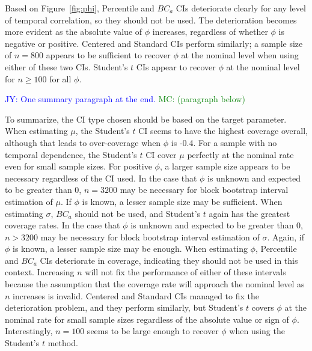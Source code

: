 \documentclass[12pt, letterpaper, titlepage]{article}
\newcommand{\jy}[1]{\textcolor{blue}{JY: #1}}
\newcommand{\mc}[1]{\textcolor{green}{MC: (#1)}}
\begin{document}
Based on Figure~\ref{fig:phi}, 
Percentile and $BC_a$ CIs deteriorate clearly for any level of temporal correlation,
so they should not be used. The deterioration becomes more evident
as the absolute value of $\phi$ increases, regardless of whether $\phi$ is 
negative or positive. Centered and Standard CIs perform similarly;
a sample size of $n = 800$ appears to be sufficient to recover $\phi$ at the 
nominal level when using either of these two CIs. 
Student's $t$ CIs appear to recover $\phi$ at the nominal level for $n \geq 100$ for all 
$\phi$.

\jy{One summary paragraph at the end.}
\mc{paragraph below}

To summarize, the CI type chosen should be based on the target parameter. 
When estimating $\mu$, the Student's $t$ CI seems to have the highest coverage
overall, although that leads to over-coverage when $\phi$ is -0.4. For a
sample with no temporal dependence, the Student's $t$ CI cover $\mu$ perfectly
at the nominal rate even for small sample sizes. For positive $\phi$, a larger
sample size appears to be necessary regardless of the CI used. In the case
that $\phi$ is unknown and expected to be greater than $0$, $n = 3200$ may be
necessary for block bootstrap interval estimation of $\mu$. If $\phi$ is known,
a lesser sample size may be sufficient. When estimating $\sigma$,
$BC_a$ should not be used, and Student's $t$ again has the greatest coverage
rates. In the case that $\phi$ is unknown and expected to be greater than $0$,
$n > 3200$ may be necessary for block bootstrap interval estimation of
$\sigma$. Again, if $\phi$ is known, a lesser sample size may be enough.
When estimating $\phi$, Percentile and $BC_a$ CIs 
deteriorate in coverage, indicating they should not be used in this context. 
Increasing $n$ will not fix the performance of either of these intervals 
because the assumption that the coverage rate will approach the nominal level
as $n$ increases is invalid. Centered and Standard CIs managed to fix the
deterioration problem, and they perform similarly, but Student's $t$ covers
$\phi$ at the nominal rate for small sample sizes regardless of the absolute
value or sign of $\phi$. Interestingly, $n = 100$ seems to be large enough to
recover $\phi$ when using the Student's $t$ method.
\end{document}
